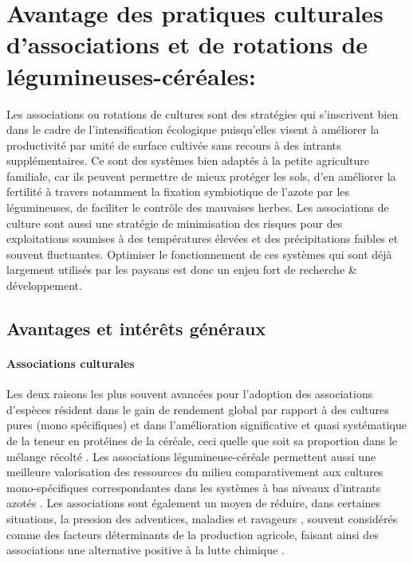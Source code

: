 \documentclass[a4paper,11pt]{article}
\begin{document}
\section{Avantage des pratiques culturales d'associations et de rotations de légumineuses-céréales:}

Les associations ou rotations de cultures sont des stratégies qui
s'inscrivent bien dans le cadre de l'intensification écologique
puisqu'elles visent à améliorer la productivité par unité de surface
cultivée sans recours à des intrants supplémentaires. Ce sont des
systèmes bien adaptés à la petite agriculture familiale, car ils
peuvent permettre de mieux protéger les sols, d'en améliorer la
fertilité à travers notamment la fixation symbiotique de l'azote par
les légumineuses, de faciliter le contrôle des mauvaises herbes. Les
associations de culture sont aussi une stratégie de minimisation des
risques pour des exploitations soumises à des températures élevées et
des précipitations faibles et souvent fluctuantes. Optimiser le
fonctionnement de ces systèmes qui sont déjà largement utilisés par
les paysans est donc un enjeu fort de recherche \& développement.


\subsection{Avantages et intérêts généraux}

\paragraph{Associations culturales} Les deux raisons les plus souvent
avancées pour l'adoption des associations d'espèces résident dans le
gain de rendement global par rapport à des cultures pures (mono
spécifiques) et dans l'amélioration significative et quasi
systématique de la teneur en protéines de la céréale, ceci quelle que
soit sa proportion dans le mélange récolté \cite{Jensen_1996}. Les
associations légumineuse-céréale permettent aussi une meilleure
valorisation des ressources du milieu comparativement aux cultures
mono-spécifiques correspondantes dans les systèmes à bas niveaux
d'intrants azotés \cite{Bedoussac_2010}. Les associations sont
également un moyen de réduire, dans certaines situations, la pression
des adventices, maladies et ravageurs \cite{Altieri_1999}, souvent
considérés comme des facteurs déterminants de la production agricole,
faisant ainsi des associations une alternative positive à la lutte
chimique \cite{Hauggaard_2001}.
\end{document}
